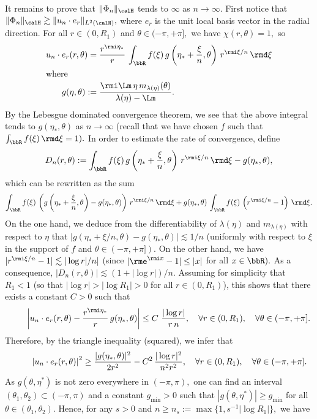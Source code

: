 \begin{proofc}
\begin{step}\label{listproofprop3.7.4}
It remains to prove that $\| \Phi_n \|_\calH$ tends to $\infty$ as $n \to \infty$. First notice that $\| \Phi_n \|_\calH \gtrsim \| u_n\cdot e_r \|_{L^2(\calN)},$ where $e_r$ is the unit local basis vector in the radial direction. For all $r \in (0,R_1)$ and $\theta \in (-\pi,+\pi],$ we have $\chi(r,\theta) = 1,$ so
\begin{align*}
u_n\cdot e_r(r,\theta) =&\;\frac{r^{\rmi\eta_*}}{r}\,
\int_{\bbR} f(\xi)\, g\left(\eta_* + \frac{\xi}{n},\theta\right)\,r^{\rmi\xi/n} \,\rmd \xi\\
\intertext{where}
 g(\eta,\theta) :=&\;\frac{\rmi\Lm\,\eta\,m_{\lambda(\eta)}(\theta)}{\lambda(\eta)-\Lm}.
\end{align*}
By the Lebesgue dominated convergence theorem, we see that the above integral tends to $g(\eta_*,\theta)$ as $n \to \infty$ (recall that we have chosen $f$ such that $\int_{\bbR} f(\xi) \,\rmd \xi = 1).$ In order to estimate the rate of convergence, define
\[
D_n(r,\theta) := \int_{\bbR} f(\xi)\, g\left(\eta_* + \frac{\xi}{n},\theta\right)
\,r^{\rmi\xi/n} \,\rmd \xi - g(\eta_*,\theta),
\]
which can be rewritten as the sum
\[
\int_{\bbR} f(\xi)\, \left(g\left(\eta_* + \frac{\xi}{n},\theta\right) - g(\eta_*,\theta)\right)\,r^{\rmi\xi/n} \,\rmd \xi + g(\eta_*,\theta)\,\int_{\bbR} f(\xi)\, \left(r^{\rmi\xi/n} - 1 \right) \,\rmd \xi.
\]
On the one hand, we deduce from the differentiability of $\lambda(\eta)$ and $m_{\lambda(\eta)}$ with respect to $\eta$ that $| g(\eta_* + \xi/n,\theta) - g(\eta_*,\theta)| \lesssim 1/n$ (uniformly with respect to $\xi$ in the support of $f$ and $\theta \in (-\pi,+\pi]).$ On the other hand, we have $|r^{\rmi\xi/n} - 1| \lesssim |\log r|/n|$ (since $|\rme^{\rmi x} - 1| \leq |x|$ for all $x \in \bbR).$ As a consequence, $|D_n(r,\theta)| \lesssim (1 +|\log r|)/n.$ Assuming for simplicity that $R_1 < 1$ (so that $|\log r| > |\log R_1| > 0$ for all $r \in (0,R_1)$), this shows that there exists a constant $C>0$ such that
\[
\mkern40mu\left| u_n\cdot e_r(r,\theta) - \frac{r^{\rmi\eta_*}}{r}\, g(\eta_*,\theta) \right|
\leq C\ \frac{|\log r|}{r\,n},
\quad \forall r \in (0,R_1), \quad \forall \theta \in (-\pi,+\pi].
\]
Therefore, by the triangle inequality (squared), we infer that
\[
\mkern45mu\left| u_n\cdot e_r(r,\theta) \right|^2
\geq \frac{|g(\eta_*,\theta)|^2}{2r^2} - C^2\,\frac{|\log r|^2}{n^2r^2},
\quad \forall r \in (0,R_1), \quad \forall \theta \in (-\pi,+\pi].
\]
As $g(\theta,\eta^*)$ is not zero everywhere in $(-\pi,\pi),$ one can find an interval $(\theta_1,\theta_2) \subset (-\pi,\pi)$ and a constant $g_{\min} > 0$ such that $|g(\theta,\eta^*)| \geq g_{\min}$ for all $\theta \in (\theta_1,\theta_2).$ Hence, for any $s > 0$ and $n \geq n_s := \max\big\{1,s^{-1}|\log R_1|\big\},$ we have

\end{step}
\end{proofc}
